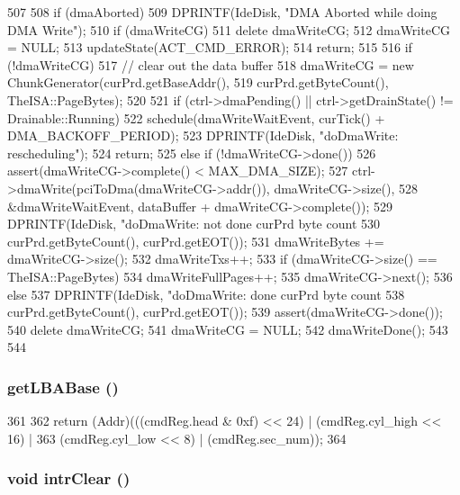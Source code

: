 \begin{DoxyCode}
507 {
508     if (dmaAborted) {
509         DPRINTF(IdeDisk, "DMA Aborted while doing DMA Write\n");
510         if (dmaWriteCG)
511             delete dmaWriteCG;
512         dmaWriteCG = NULL;
513         updateState(ACT_CMD_ERROR);
514         return;
515     }
516     if (!dmaWriteCG) {
517         // clear out the data buffer
518         dmaWriteCG = new ChunkGenerator(curPrd.getBaseAddr(),
519                 curPrd.getByteCount(), TheISA::PageBytes);
520     }
521     if (ctrl->dmaPending() || ctrl->getDrainState() != Drainable::Running) {
522         schedule(dmaWriteWaitEvent, curTick() + DMA_BACKOFF_PERIOD);
523         DPRINTF(IdeDisk, "doDmaWrite: rescheduling\n");
524         return;
525     } else if (!dmaWriteCG->done()) {
526         assert(dmaWriteCG->complete() < MAX_DMA_SIZE);
527         ctrl->dmaWrite(pciToDma(dmaWriteCG->addr()), dmaWriteCG->size(),
528                 &dmaWriteWaitEvent, dataBuffer + dmaWriteCG->complete());
529         DPRINTF(IdeDisk, "doDmaWrite: not done curPrd byte count %
530                 curPrd.getByteCount(), curPrd.getEOT());
531         dmaWriteBytes += dmaWriteCG->size();
532         dmaWriteTxs++;
533         if (dmaWriteCG->size() == TheISA::PageBytes)
534             dmaWriteFullPages++;
535         dmaWriteCG->next();
536     } else {
537         DPRINTF(IdeDisk, "doDmaWrite: done curPrd byte count %
538                 curPrd.getByteCount(), curPrd.getEOT());
539         assert(dmaWriteCG->done());
540         delete dmaWriteCG;
541         dmaWriteCG = NULL;
542         dmaWriteDone();
543     }
544 }
\end{DoxyCode}
\hypertarget{classIdeDisk_af02a88c6960b020d71b0d6b95e41bab1}{
\subsubsection[{getLBABase}]{ getLBABase ()}}
\label{classIdeDisk_af02a88c6960b020d71b0d6b95e41bab1}



\begin{DoxyCode}
361     {
362         return  (Addr)(((cmdReg.head & 0xf) << 24) | (cmdReg.cyl_high << 16) |
363                        (cmdReg.cyl_low << 8) | (cmdReg.sec_num));
364     }
\end{DoxyCode}
\hypertarget{classIdeDisk_ac02b8a3b8685eca8bb4b237b29dfc762}{
\subsubsection[{intrClear}]{\setlength{\rightskip}{0pt plus 5cm}void intrClear ()}}
\label{classIdeDisk_ac02b8a3b8685eca8bb4b237b29dfc762}



